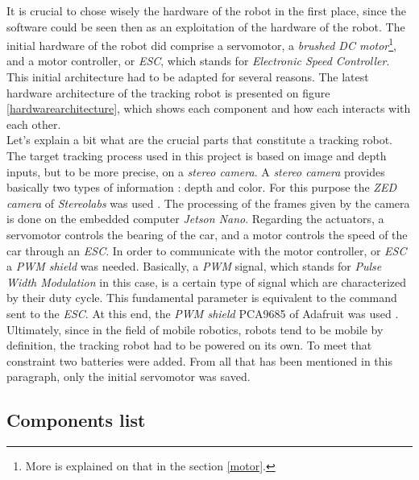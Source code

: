 		It is crucial to chose wisely the hardware of the robot in the first place, since
		the software could be seen then as an exploitation of the hardware of 
		the robot. The initial hardware of the robot did comprise
		a servomotor, a \textit{brushed DC motor}\footnote{More is explained 
		on that in the section \vref{motor}.}, and a motor controller, or \textit{ESC}, which
		stands for \textit{ Electronic Speed Controller}.
		\\\indent This initial architecture had to be adapted for several reasons.
		The latest hardware architecture of the tracking robot is
		presented on figure \vref{hardwarearchitecture}, which
		shows each component and how each interacts with each other.
		\\\indent Let's explain a bit what are the crucial parts
		that constitute a tracking robot. The target tracking process used
		in this project is based on image and depth inputs, but to be more
		precise, on a \textit{stereo camera}. A \textit{stereo camera}
		provides basically two types of information : depth and color.
		For this purpose the \textit{ZED camera} of \textit{Stereolabs}
		was used \cite{zeddoc}. The processing of the frames
		given by the camera is done on the embedded computer
		\textit{Jetson Nano}. Regarding the actuators, a servomotor
		controls the bearing of the car, and a motor controls the speed
		of the car through an \textit{ESC}. In order to communicate
		with the motor controller, or \textit{ESC} a \textit{PWM shield}
		was needed. Basically, a \textit{PWM} signal, which stands for
		\textit{Pulse Width Modulation} in this case, is a certain type
		of signal which are characterized by their duty cycle. This 
		fundamental parameter is equivalent to the command sent 
		to the \textit{ESC}. At this end, the \textit{PWM shield} PCA9685
		of Adafruit was used \cite{adafruitpwm}. Ultimately, since
		in the field of mobile robotics, robots tend to be mobile by definition,
		the tracking robot had to be powered on its own. To 
		meet that constraint two batteries were added. From all that has
		been mentioned in this paragraph, only the initial servomotor was
		saved.
		
		\begin{figure}
			\label{hardwarearchitecture}
		\end{figure}

		\subsection{Components list}
		

